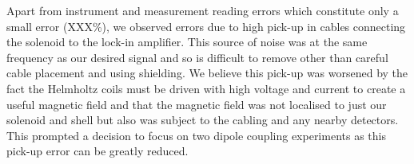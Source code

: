 \documentclass[11pt]{iopart}
\begin{document}
Apart from instrument and measurement reading errors which constitute
only a small error (XXX\%), we observed errors due to high pick-up in
cables connecting the solenoid to the lock-in amplifier. This source
of noise was at the same frequency as our desired signal and so is
difficult to remove other than careful cable placement and using
shielding. We believe this pick-up was worsened by the fact the
Helmholtz coils must be driven with high voltage and current to
create a useful magnetic field and that the magnetic field was not
localised to just our solenoid and shell but also was subject to the
cabling and any nearby detectors. This prompted a decision to focus on
two dipole coupling experiments as this pick-up error can be greatly
reduced.\\

\end{document}
